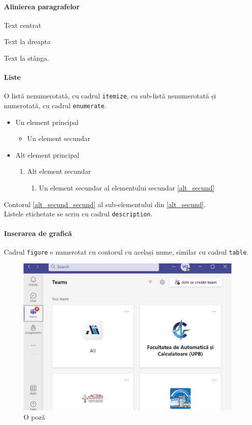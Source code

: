 \documentclass{article}
\begin{document}
\paragraph{Alinierea paragrafelor}
\begin{center}
Text centrat
\end{center}
\begin{flushright}
Text la dreapta
\end{flushright}
\begin{flushleft}
Text la stânga.
\end{flushleft}
\paragraph{Liste}
O listă nenumerotată, cu cadrul \verb+itemize+, cu sub-listă nenumerotată și numerotată, cu cadrul \verb+enumerate+.
\begin{itemize}
\item Un element principal
\begin{itemize}
\item Un element secundar
\end{itemize}
\item Alt element principal
\begin{enumerate}
\item Alt element secundar \label{alt_secund}
\begin{enumerate}
\item Un element secundar al elementului secundar \ref{alt_secund} \label{alt_secund_secund}
\end{enumerate}
\end{enumerate}
\end{itemize}
Contorul \ref{alt_secund_secund} al sub-elementului din \ref{alt_secund}. \\
Listele etichetate se scriu cu cadrul \verb+description+.
\paragraph{Inserarea de grafică}
Cadrul \verb+figure+ e numerotat cu contorul cu același nume, similar cu cadrul \verb+table+.
\begin{figure}[b]
\centering
\includegraphics[scale=0.2]{poza.pdf}
\caption{O poză}
\end{figure}
\end{document}
